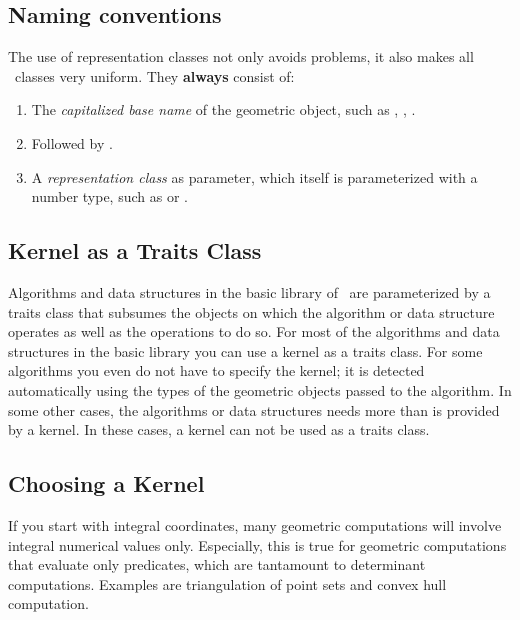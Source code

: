 \subsection{Naming conventions}

The use of representation classes not only avoids problems, it also
makes all \cgal\ classes very uniform. They {\bf always} consist of:
\begin{enumerate}
\begin{ccTexOnly}
\itemsep0pt\parskip0pt
\end{ccTexOnly}

\item The {\em capitalized base name} of the geometric object, such as
  , , .

\item Followed by .
  
\item A {\em representation class} as parameter, which itself is
  parameterized with a number type, such as
   or .
\end{enumerate}

\subsection{Kernel as a Traits Class}

Algorithms and data structures in the basic library of \cgal\ are
parameterized by a traits class that subsumes the objects on which the
algorithm or data structure operates as well as the operations to do
so. For most of the algorithms and data structures in the basic
library you can use a kernel as a traits class. For some algorithms
you even do not have to specify the kernel; it is detected
automatically using the types of the geometric objects passed to the
algorithm. In some other cases, the algorithms or data structures
needs more than is provided by a kernel. In these cases, a kernel can
not be used as a traits class.

\subsection{Choosing a Kernel}

If you start with integral  coordinates,
many geometric computations will involve integral numerical values
only. Especially, this is true for geometric computations that
evaluate only predicates, which are tantamount to determinant
computations. Examples are triangulation of point sets and convex hull
computation.  

